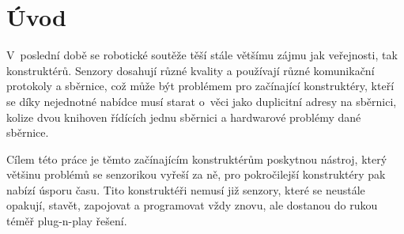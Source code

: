 \chapter*{Úvod}
V~poslední době se robotické soutěže těší stále většímu zájmu jak veřejnosti, tak konstruktérů.
Senzory dosahují různé kvality a používají různé komunikační protokoly a sběrnice, což může být problémem pro začínající konstruktéry, kteří se díky nejednotné nabídce musí starat o~věci jako duplicitní adresy na sběrnici, kolize dvou knihoven řídících jednu sběrnici a hardwarové problémy dané sběrnice.

Cílem této práce je těmto začínajícím konstruktérům poskytnou nástroj, který většinu problémů se senzorikou vyřeší za ně, pro pokročilejší konstruktéry pak nabízí úsporu času.
Tito konstruktéři nemusí již senzory, které se neustále opakují, stavět, zapojovat a programovat vždy znovu, ale dostanou do rukou téměř plug-n-play řešení.


\newpage